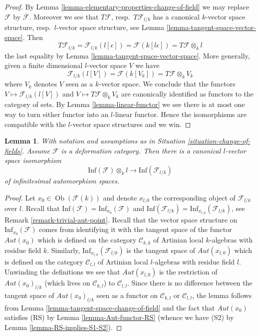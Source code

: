 \documentclass{stacks-project}
\theoremstyle{plain}
\newtheorem{lemma}[subsection]{Lemma}
\theoremstyle{definition}
\theoremstyle{remark}
\numberwithin{equation}{subsection}
\def\Ob{\mathop{\mathrm{Ob}}\nolimits}
\begin{document}
\begin{proof}
By Lemma \ref{lemma-elementary-properties-change-of-field} we may replace
$\mathcal{F}$ by $\overline{\mathcal{F}}$. Moreover we see that
$T\mathcal{F}$, resp.\ $T\mathcal{F}_{l/k}$ has a canonical
$k$-vector space structure, resp.\ $l$-vector space structure, see
Lemma \ref{lemma-tangent-space-vector-space}. Then
$$
T\mathcal{F}_{l/k} = \mathcal{F}_{l/k}(l[\epsilon])
= \mathcal{F}(k[l\epsilon]) = T\mathcal{F} \otimes_k l
$$
the last equality by Lemma \ref{lemma-tangent-space-vector-space}.
More generally, given a finite dimensional $l$-vector space $V$ we have
$$
\mathcal{F}_{l/k}(l[V]) = \mathcal{F}(k[V_k]) = T\mathcal{F} \otimes_k V_k
$$
where $V_k$ denotes $V$ seen as a $k$-vector space. We conclude that
the functors $V \mapsto \mathcal{F}_{l/k}(l[V])$ and
$V \mapsto T\mathcal{F} \otimes_k V_k$ are canonically identified
as functors to the category of sets. By Lemma \ref{lemma-linear-functor}
we see there is at most one way to turn either functor into an $l$-linear
functor. Hence the isomorphisms are compatible with the $l$-vector space
structures and we win.
\end{proof}

\begin{lemma}
\label{lemma-inf-aut-change-of-field}
With notation and assumptions as in Situation \ref{situation-change-of-fields}.
Assume $\mathcal{F}$ is a deformation category.
Then there is a
canonical $l$-vector space isomorphism
$$
\text{Inf}(\mathcal{F}) \otimes_k l
\longrightarrow
\text{Inf}(\mathcal{F}_{l/k})
$$
of infinitesimal automorphism spaces.
\end{lemma}

\begin{proof}
Let $x_0 \in \Ob(\mathcal{F}(k))$ and denote $x_{l, 0}$ the corresponding
object of $\mathcal{F}_{l/k}$ over $l$. Recall that
$\text{Inf}(\mathcal{F}) = \text{Inf}_{x_0}(\mathcal{F})$ and
$\text{Inf}(\mathcal{F}_{l/k}) = \text{Inf}_{x_{l, 0}}(\mathcal{F}_{l/k})$,
see Remark \ref{remark-trivial-aut-point}.
Recall that the vector space structure on
$\text{Inf}_{x_0}(\mathcal{F})$ comes from identifying it with the tangent
space of the functor $\mathit{Aut}(x_0)$ which is defined on
the category $\mathcal{C}_{k, k}$ of Artinian local $k$-algebras with
residue field $k$. Similarly, $\text{Inf}_{x_{l, 0}}(\mathcal{F}_{l/k})$
is the tangent space of $\mathit{Aut}(x_{l, 0})$ which is defined on the
category $\mathcal{C}_{l, l}$ of Artinian local $l$-algebras with residue
field $l$. Unwinding the definitions we see that
$\mathit{Aut}(x_{l, 0})$ is the restriction of $\mathit{Aut}(x_0)_{l/k}$
(which lives on $\mathcal{C}_{k, l}$) to $\mathcal{C}_{l, l}$. Since
there is no difference between the tangent space of
$\mathit{Aut}(x_0)_{l/k}$ seen as a functor on $\mathcal{C}_{k, l}$ or
$\mathcal{C}_{l, l}$, the lemma follows from 
Lemma \ref{lemma-tangent-space-change-of-field}
and the fact that $\mathit{Aut}(x_0)$ satisfies (RS) by
Lemma \ref{lemma-Aut-functor-RS} (whence we have (S2) by
Lemma \ref{lemma-RS-implies-S1-S2}).
\end{proof}
\end{document}

